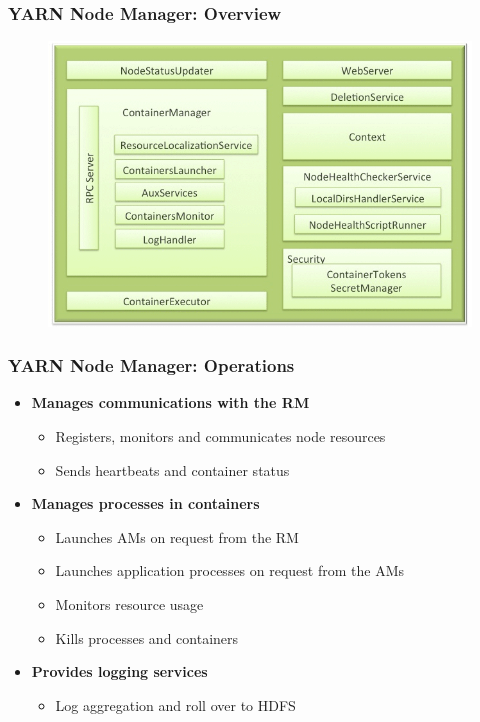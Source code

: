 \begin{frame}
\frametitle{YARN Node Manager: Overview}
  \begin{figure}[h]
    \centering
    \includegraphics[scale=0.4]{./figures/yarn_NM}
    \label{fig:yarn_NM}
  \end{figure}
\end{frame}

\begin{frame}
\frametitle{YARN Node Manager: Operations}
\begin{itemize}
  \item {\bf Manages communications with the RM}
  \begin{itemize}
    \item Registers, monitors and communicates node resources
    \item Sends heartbeats and container status
  \end{itemize}
  \item {\bf Manages processes in containers}
  \begin{itemize}
    \item Launches AMs on request from the RM
    \item Launches application processes on request from the AMs
    \item Monitors resource usage
    \item Kills processes and containers
  \end{itemize}
  \item {\bf Provides logging services}
  \begin{itemize}
    \item Log aggregation and roll over to HDFS
  \end{itemize}
\end{itemize}
\end{frame}

